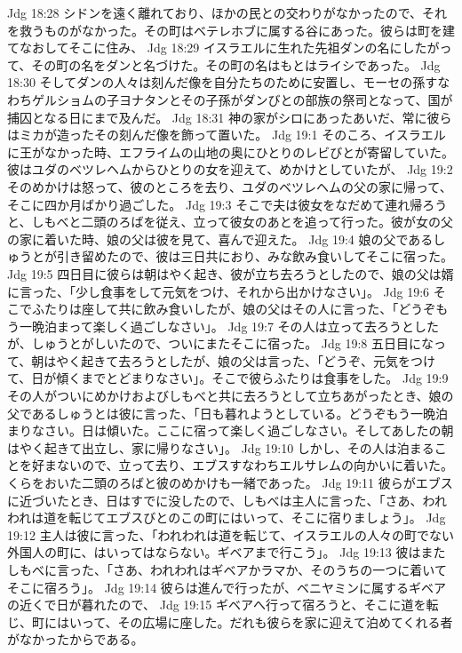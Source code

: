 Jdg 18:28  シドンを遠く離れており、ほかの民との交わりがなかったので、それを救うものがなかった。その町はベテレホブに属する谷にあった。彼らは町を建てなおしてそこに住み、
Jdg 18:29  イスラエルに生れた先祖ダンの名にしたがって、その町の名をダンと名づけた。その町の名はもとはライシであった。
Jdg 18:30  そしてダンの人々は刻んだ像を自分たちのために安置し、モーセの孫すなわちゲルショムの子ヨナタンとその子孫がダンびとの部族の祭司となって、国が捕囚となる日にまで及んだ。
Jdg 18:31  神の家がシロにあったあいだ、常に彼らはミカが造ったその刻んだ像を飾って置いた。
Jdg 19:1  そのころ、イスラエルに王がなかった時、エフライムの山地の奥にひとりのレビびとが寄留していた。彼はユダのベツレヘムからひとりの女を迎えて、めかけとしていたが、
Jdg 19:2  そのめかけは怒って、彼のところを去り、ユダのベツレヘムの父の家に帰って、そこに四か月ばかり過ごした。
Jdg 19:3  そこで夫は彼女をなだめて連れ帰ろうと、しもべと二頭のろばを従え、立って彼女のあとを追って行った。彼が女の父の家に着いた時、娘の父は彼を見て、喜んで迎えた。
Jdg 19:4  娘の父であるしゅうとが引き留めたので、彼は三日共におり、みな飲み食いしてそこに宿った。
Jdg 19:5  四日目に彼らは朝はやく起き、彼が立ち去ろうとしたので、娘の父は婿に言った、「少し食事をして元気をつけ、それから出かけなさい」。
Jdg 19:6  そこでふたりは座して共に飲み食いしたが、娘の父はその人に言った、「どうぞもう一晩泊まって楽しく過ごしなさい」。
Jdg 19:7  その人は立って去ろうとしたが、しゅうとがしいたので、ついにまたそこに宿った。
Jdg 19:8  五日目になって、朝はやく起きて去ろうとしたが、娘の父は言った、「どうぞ、元気をつけて、日が傾くまでとどまりなさい」。そこで彼らふたりは食事をした。
Jdg 19:9  その人がついにめかけおよびしもべと共に去ろうとして立ちあがったとき、娘の父であるしゅうとは彼に言った、「日も暮れようとしている。どうぞもう一晩泊まりなさい。日は傾いた。ここに宿って楽しく過ごしなさい。そしてあしたの朝はやく起きて出立し、家に帰りなさい」。
Jdg 19:10  しかし、その人は泊まることを好まないので、立って去り、エブスすなわちエルサレムの向かいに着いた。くらをおいた二頭のろばと彼のめかけも一緒であった。
Jdg 19:11  彼らがエブスに近づいたとき、日はすでに没したので、しもべは主人に言った、「さあ、われわれは道を転じてエブスびとのこの町にはいって、そこに宿りましょう」。
Jdg 19:12  主人は彼に言った、「われわれは道を転じて、イスラエルの人々の町でない外国人の町に、はいってはならない。ギベアまで行こう」。
Jdg 19:13  彼はまたしもべに言った、「さあ、われわれはギベアかラマか、そのうちの一つに着いてそこに宿ろう」。
Jdg 19:14  彼らは進んで行ったが、ベニヤミンに属するギベアの近くで日が暮れたので、
Jdg 19:15  ギベアへ行って宿ろうと、そこに道を転じ、町にはいって、その広場に座した。だれも彼らを家に迎えて泊めてくれる者がなかったからである。
